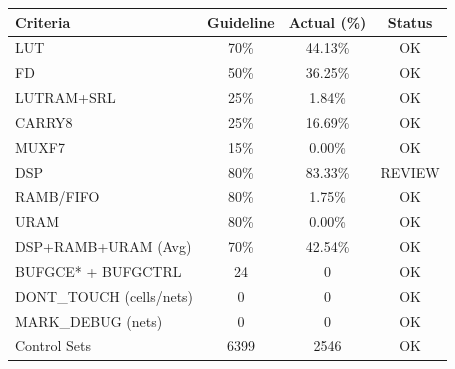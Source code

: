 \documentclass{article}
\begin{document}
\begin{table}[H]
    \begin{tabular}{|l|c|c|c|}
    \hline
    \textbf{Criteria}                                                  & \textbf{Guideline} & \textbf{Actual (\%)} & \textbf{Status} \\ \hline
    LUT                                                               & 70\%               & 44.13\%              & OK              \\ \hline
    FD                                                                & 50\%               & 36.25\%              & OK              \\ \hline
    LUTRAM+SRL                                                        & 25\%               & 1.84\%               & OK              \\ \hline
    CARRY8                                                            & 25\%               & 16.69\%              & OK              \\ \hline
    MUXF7                                                             & 15\%               & 0.00\%               & OK              \\ \hline
    DSP                                                               & 80\%               & 83.33\%              & REVIEW          \\ \hline
    RAMB/FIFO                                                         & 80\%               & 1.75\%               & OK              \\ \hline
    URAM                                                              & 80\%               & 0.00\%               & OK              \\ \hline
    DSP+RAMB+URAM (Avg)                                               & 70\%               & 42.54\%              & OK              \\ \hline
    BUFGCE* + BUFGCTRL                                                & 24                 & 0                    & OK              \\ \hline
    DONT\_TOUCH (cells/nets)                                          & 0                  & 0                    & OK              \\ \hline
    MARK\_DEBUG (nets)                                                & 0                  & 0                    & OK              \\ \hline
    Control Sets                                                      & 6399               & 2546                 & OK              \\ \hline

\end{tabular}
\end{table}
\end{document}
